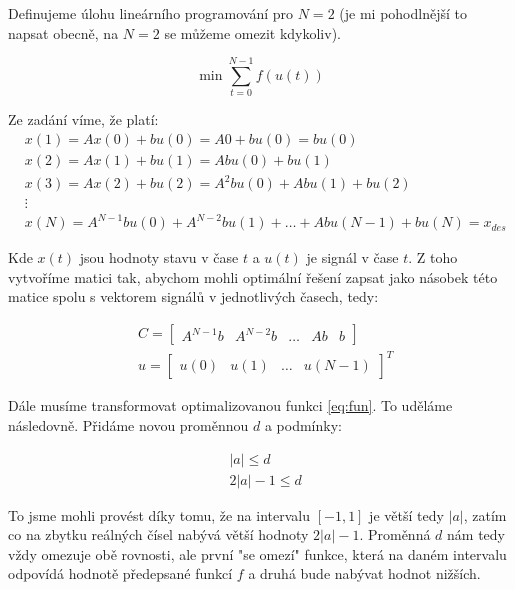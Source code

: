 \documentclass[10pt,a4paper,openright]{article}
\begin{document}
Definujeme úlohu lineárního programování pro $N=2$ (je mi pohodlnější to napsat obecně,
na $N=2$ se můžeme omezit kdykoliv).

\begin{equation}
\min \sum_{t=0}^{N-1} f(u(t))
\end{equation}

Ze zadání víme, že platí:
\begin{equation}
	\begin{split}
		&x(1) = Ax(0) + bu(0) = A0 + bu(0) = bu(0)\\
		&x(2) = Ax(1) + bu(1) = Abu(0) + bu(1)\\
		&x(3) = Ax(2) + bu(2) = A^2bu(0) + Abu(1) + bu(2)\\
		&\vdots\\
		&x(N) = A^{N-1}bu(0) + A^{N-2}bu(1) + \hdots + Abu(N-1) + bu(N) = x_{des}
	\end{split}
\end{equation}

Kde $x(t)$ jsou hodnoty stavu v čase $t$ a $u(t)$ je signál v čase $t$. Z toho vytvoříme matici tak, abychom mohli optimální řešení zapsat jako násobek této matice
spolu s vektorem signálů v jednotlivých časech, tedy:

\begin{equation}\label{eq:defs}
	\begin{split}
	&C = \begin{bmatrix}A^{N-1}b & A^{N-2}b & \hdots & Ab & b \end{bmatrix}\\
	&u = \begin{bmatrix}u(0) & u(1) & \hdots & u(N-1)\end{bmatrix}^T
	\end{split}
\end{equation}

Dále musíme transformovat optimalizovanou funkci \ref{eq:fun}. 
To uděláme následovně. Přidáme novou proměnnou $d$ a podmínky:

\begin{equation}\label{eq:limits}
	\begin{split}
	&|a| \leq d\\
	&2|a| - 1 \leq d
	\end{split}
\end{equation}

To jsme mohli provést díky tomu, že na intervalu $[-1,1]$ je větší tedy $|a|$,
zatím co na zbytku reálných čísel nabývá větší hodnoty $2|a| - 1$.
Proměnná $d$ nám tedy vždy omezuje obě rovnosti, ale první "se omezí" funkce,
která na daném intervalu odpovídá hodnotě předepsané funkcí $f$ a druhá bude nabývat hodnot nižších.
\end{document}
